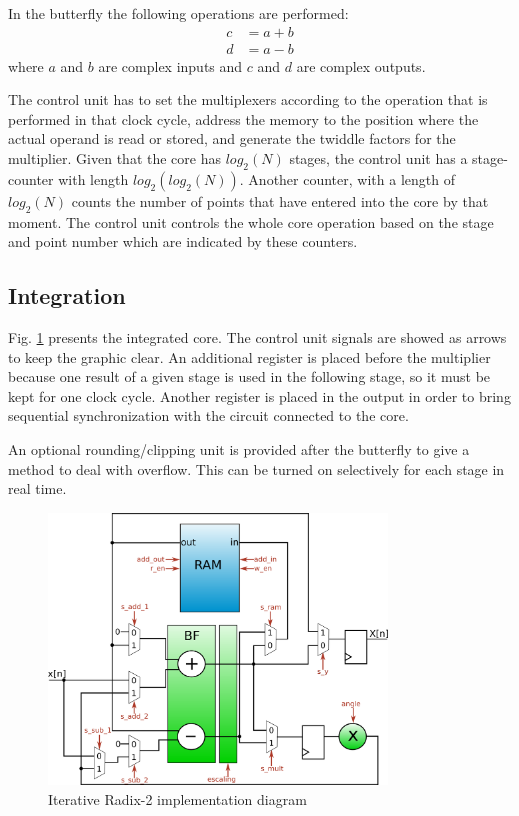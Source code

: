 \documentclass[conference]{IEEEtran}
\begin{document}
In the butterfly the following operations are performed:
\begin{equation}
\begin{split}
c &= a+b \\
d &= a-b
\end{split}
\label{eq:butterf}
\end{equation} 
where $a$ and $b$ are complex inputs and $c$ and $d$ are complex outputs.

The control unit has to set the multiplexers according to the operation that is performed in that clock cycle, address the memory to the 
position where the actual operand is read or stored, and generate the twiddle factors for the multiplier.
Given that the core has $log_2(N)$ stages, the control unit has a stage-counter with length $log_2(log_2(N))$. Another counter, with a
length of $log_2(N)$ counts the number of points that have entered into the core by that moment. The control unit controls the whole core 
operation based on the stage and point number which are indicated by these counters.

\subsection{Integration}

Fig. \ref{fig:datapathmem} presents the integrated core. The control unit signals are showed as arrows to keep the graphic clear.
An additional register is placed before the multiplier because one result of a given stage is used in the following stage, so
it must be kept for one clock cycle. Another register is placed in the output in order to bring sequential synchronization 
with the circuit connected to the core.

An optional rounding/clipping unit is provided after the butterfly to give a method to deal with overflow. This can be turned on 
selectively for each stage in real time. 

\begin{figure}[htb!]
        \centering
        \includegraphics[width=9cm]{./figures/datapathMem.png}
        \caption{Iterative Radix-2 implementation diagram}
        \label{fig:datapathmem}
\end{figure}
 
\end{document}
